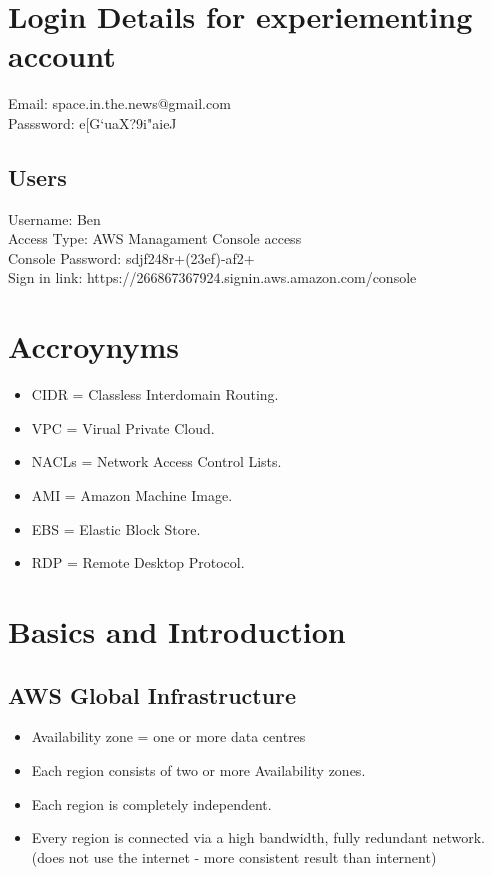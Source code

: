\documentclass[11pt]{article}
\begin{document}
    \section*{Login Details for experiementing account}
    Email: space.in.the.news@gmail.com
    \\
    Passsword: e[G`uaX?9i"aieJ

    \subsection{Users}
    Username: Ben
    \\
    Access Type: AWS Managament Console access
    \\
    Console Password: sdjf248r+(23ef)-af2+
    \\
    Sign in link: https://266867367924.signin.aws.amazon.com/console

    \section{Accroynyms}
    \begin{itemize}
        \item CIDR = Classless Interdomain Routing.
        \item VPC = Virual Private Cloud.
        \item NACLs = Network Access Control Lists.
        \item AMI = Amazon Machine Image.
        \item EBS = Elastic Block Store.
        \item RDP = Remote Desktop Protocol.
    \end{itemize}

    \section{Basics and Introduction}
    \subsection{AWS Global Infrastructure}
    \begin{itemize}
        \item Availability zone = one or more data centres
        \item Each region consists of two or more Availability zones.
        \item Each region is completely independent.
        \item Every region is connected via a high bandwidth, fully redundant network. (does not use the internet - more consistent result than internent)
    \end{itemize}
\end{document}
